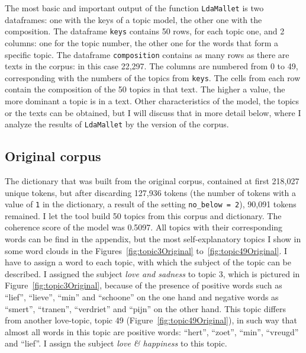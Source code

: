 \noindent The most basic and important output of the function \texttt{LdaMallet} is two dataframes: one with the keys of a topic model, the other one with the composition. The dataframe \texttt{keys} contains 50 rows, for each topic one, and 2 columns: one for the topic number, the other one for the words that form a specific topic. The dataframe \texttt{composition} contains as many rows as there are texts in the corpus: in this case 22,297. The columns are numbered from 0 to 49, corresponding with the numbers of the topics from \texttt{keys}. The cells from each row contain the composition of the 50 topics in that text. The higher a value, the more dominant a topic is in a text. Other characteristics of the model, the topics or the texts can be obtained, but I will discuss that in more detail below, where I analyze the results of \texttt{LdaMallet} by the version of the corpus.

\subsection{Original corpus}
The dictionary that was built from the original corpus, contained at first 218,027 unique tokens, but after discarding 127,936 tokens (the number of tokens with a value of \texttt{1} in the dictionary, a result of the setting \texttt{no\_below = 2}), 90,091 tokens remained. I let the tool build 50 topics from this corpus and dictionary. The coherence score of the model was 0.5097. All topics with their corresponding words can be find in the appendix, but the most self-explanatory topics I show in some word clouds in the Figures~\ref{fig:topic3Original} to~\ref{fig:topic49Original}. I have to assign a word to each topic, with which the subject of the topic can be described. I assigned the subject \textit{love and sadness} to topic 3, which is pictured in Figure~\ref{fig:topic3Original}, because of the presence of positive words such as \enquote{lief}, \enquote{lieve}, \enquote{min} and \enquote{schoone} on the one hand and negative words as \enquote{smert}, \enquote{tranen}, \enquote{verdriet} and \enquote{pijn} on the other hand. This topic differs from another love-topic, topic 49 (Figure~\ref{fig:topic49Original}), in such way that almost all words in this topic are positive words: \enquote{hert}, \enquote{zoet}, \enquote{min}, \enquote{vreugd} and \enquote{lief}. I assign the subject \textit{love \& happiness} to this topic.

